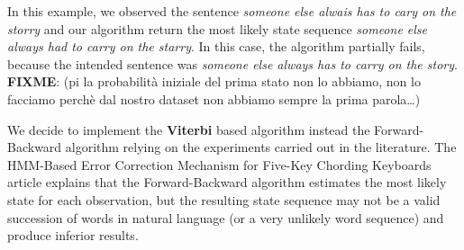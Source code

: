 In this example, we observed the sentence \textsl{someone else alwais has to cary on the storry} and our algorithm return 
the most likely state sequence \textsl{someone else always had to carry on the starry}. In this case, the algorithm partially 
fails, because the intended sentence was \textsl{someone else always has to carry on the story}.
\\
\textbf{FIXME}: (pi la probabilità iniziale del prima stato non lo abbiamo, non lo facciamo perchè dal nostro dataset non 
abbiamo sempre la prima parola…)

We decide to implement the \textbf{Viterbi} based algorithm instead the Forward-Backward algorithm relying on the 
experiments carried out in the literature.
The HMM-Based Error Correction Mechanism for Five-Key Chording Keyboards article \cite{tarniceriu2015hmm} explains 
that the Forward-Backward algorithm estimates the most likely state for each observation, but the resulting state 
sequence may not be a valid succession of words in natural language (or a very unlikely word sequence) and produce 
inferior results.


